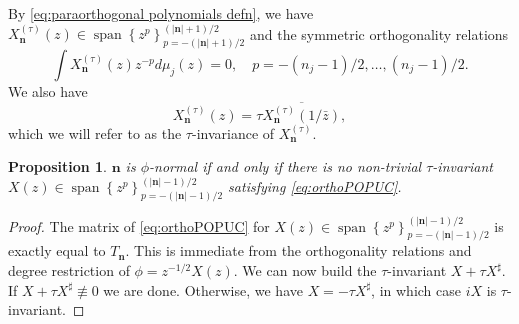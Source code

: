 \documentclass[reqno,centertags,11pt,draft]{amsart}
\newtheorem{prop}[thm]{Proposition}
\newcommand{\C}{\mathbb C}
\newcommand{\D}{\mathbb{D}}
\renewcommand{\d}{\partial}
\newcommand{\abs}[1]{\left|#1\right|}
\newcommand{\set}[1]{\left\{#1\right\}}
\newcommand{\red}[1]{{\color{red}#1}}
\begin{document}

By \eqref{eq:paraorthogonal polynomials defn}, we have $X_{\bm{n}}^{(\tau)}(z) \in \operatorname{span}\set{z^p}_{p = -(\abs{\bm{n}}+1)/2}^{(\abs{\bm{n}}+1)/2}$ and the symmetric orthogonality relations
\begin{equation}\label{eq:orthoPOPUC}
    \int X_{\bm{n}}^{(\tau)}(z)z^{-p}d\mu_j(z) = 0, \quad p = -(n_j-1)/2,\dots,(n_j-1)/2.
\end{equation}
We also have
\begin{equation}\label{eq:beta invariance}
    X_{\bm{n}}^{(\tau)}(z) = \tau\overline{X_{\bm{n}}^{(\tau)}(1/\bar{z})},
\end{equation}
which we will refer to as the $\tau$-invariance of $X_{\bm{n}}^{(\tau)}$. %

\begin{prop}\label{prop:popuc normality}
    $\bm{n}$ is $\phi$-normal if and only if there is no non-trivial $\tau$-invariant $X(z) \in \operatorname{span}\set{z^p}_{p = -(\abs{\bm{n}}-1)/2}^{(\abs{\bm{n}}-1)/2}$ satisfying \eqref{eq:orthoPOPUC}. 
\end{prop}

\begin{proof}
    The matrix of \eqref{eq:orthoPOPUC} for $X(z) \in \operatorname{span}\set{z^p}_{p = -(\abs{\bm{n}}-1)/2}^{(\abs{\bm{n}}-1)/2}$ is exactly equal to $T_{\bm{n}}$. This is immediate from the orthogonality relations and degree restriction of $\phi = z^{-1/2}X(z)$. We can now build the $\tau$-invariant $X + \tau X^\sharp$. If $X + \tau X^\sharp \not\equiv 0$ we are done. Otherwise, we have $X = -\tau X^\sharp$, in which case $iX$ is $\tau$-invariant. 
\end{proof}

\end{document}
